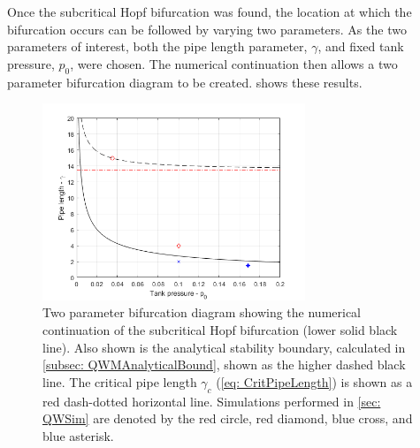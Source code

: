 Once the subcritical Hopf bifurcation was found, the location at which the bifurcation occurs can be followed by varying two parameters. As the two parameters of interest, both the pipe length parameter, $\gamma$, and fixed tank pressure, $p_0$, were chosen. The numerical continuation then allows a two parameter bifurcation diagram
to be created.  shows these results.
% 
~
\begin{figure}[ht]
    \centering
    \includegraphics[width=0.7\textwidth]{Figures/BifurcationDiagram.png}
    \caption{Two parameter bifurcation diagram showing the numerical continuation of the subcritical Hopf bifurcation (lower solid black line). Also shown is the analytical stability boundary, calculated in \cref{subsec: QWMAnalyticalBound}, shown as the higher dashed black line. The critical pipe length $\gamma_c$ (\cref{eq: CritPipeLength}) is shown as a red dash-dotted horizontal line. Simulations performed in \cref{sec: QWSim} are denoted by the red circle, red diamond, blue cross, and blue asterisk.}
    \label{fig: BifurcationDiagram}
\end{figure}
% 

